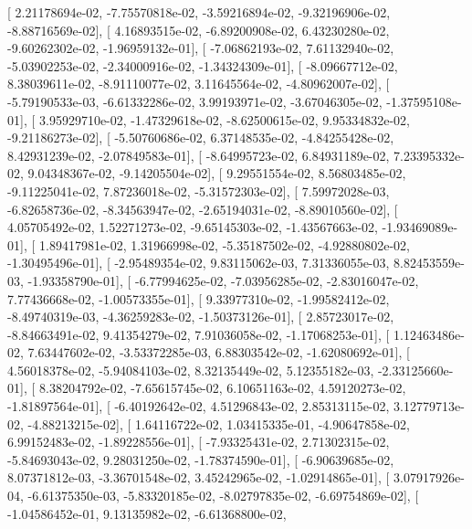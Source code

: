 \documentclass{article}
\begin{document}
       [  2.21178694e-02,  -7.75570818e-02,  -3.59216894e-02,
         -9.32196906e-02,  -8.88716569e-02],
       [  4.16893515e-02,  -6.89200908e-02,   6.43230280e-02,
         -9.60262302e-02,  -1.96959132e-01],
       [ -7.06862193e-02,   7.61132940e-02,  -5.03902253e-02,
         -2.34000916e-02,  -1.34324309e-01],
       [ -8.09667712e-02,   8.38039611e-02,  -8.91110077e-02,
          3.11645564e-02,  -4.80962007e-02],
       [ -5.79190533e-03,  -6.61332286e-02,   3.99193971e-02,
         -3.67046305e-02,  -1.37595108e-01],
       [  3.95929710e-02,  -1.47329618e-02,  -8.62500615e-02,
          9.95334832e-02,  -9.21186273e-02],
       [ -5.50760686e-02,   6.37148535e-02,  -4.84255428e-02,
          8.42931239e-02,  -2.07849583e-01],
       [ -8.64995723e-02,   6.84931189e-02,   7.23395332e-02,
          9.04348367e-02,  -9.14205504e-02],
       [  9.29551554e-02,   8.56803485e-02,  -9.11225041e-02,
          7.87236018e-02,  -5.31572303e-02],
       [  7.59972028e-03,  -6.82658736e-02,  -8.34563947e-02,
         -2.65194031e-02,  -8.89010560e-02],
       [  4.05705492e-02,   1.52271273e-02,  -9.65145303e-02,
         -1.43567663e-02,  -1.93469089e-01],
       [  1.89417981e-02,   1.31966998e-02,  -5.35187502e-02,
         -4.92880802e-02,  -1.30495496e-01],
       [ -2.95489354e-02,   9.83115062e-03,   7.31336055e-03,
          8.82453559e-03,  -1.93358790e-01],
       [ -6.77994625e-02,  -7.03956285e-02,  -2.83016047e-02,
          7.77436668e-02,  -1.00573355e-01],
       [  9.33977310e-02,  -1.99582412e-02,  -8.49740319e-03,
         -4.36259283e-02,  -1.50373126e-01],
       [  2.85723017e-02,  -8.84663491e-02,   9.41354279e-02,
          7.91036058e-02,  -1.17068253e-01],
       [  1.12463486e-02,   7.63447602e-02,  -3.53372285e-03,
          6.88303542e-02,  -1.62080692e-01],
       [  4.56018378e-02,  -5.94084103e-02,   8.32135449e-02,
          5.12355182e-03,  -2.33125660e-01],
       [  8.38204792e-02,  -7.65615745e-02,   6.10651163e-02,
          4.59120273e-02,  -1.81897564e-01],
       [ -6.40192642e-02,   4.51296843e-02,   2.85313115e-02,
          3.12779713e-02,  -4.88213215e-02],
       [  1.64116722e-02,   1.03415335e-01,  -4.90647858e-02,
          6.99152483e-02,  -1.89228556e-01],
       [ -7.93325431e-02,   2.71302315e-02,  -5.84693043e-02,
          9.28031250e-02,  -1.78374590e-01],
       [ -6.90639685e-02,   8.07371812e-03,  -3.36701548e-02,
          3.45242965e-02,  -1.02914865e-01],
       [  3.07917926e-04,  -6.61375350e-03,  -5.83320185e-02,
         -8.02797835e-02,  -6.69754869e-02],
       [ -1.04586452e-01,   9.13135982e-02,  -6.61368800e-02,
\end{document}
